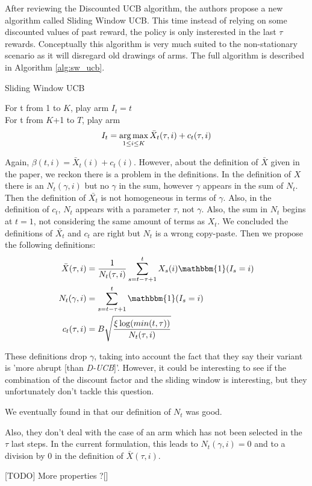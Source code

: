 After reviewing the Discounted UCB algorithm, the authors propose a new algorithm called Sliding Window UCB. This time instead of relying on some discounted values of past reward, the policy is only insterested in the last $\tau$ rewards. Conceptually this algorithm is very much suited to the non-stationary scenario as it will disregard old drawings of arms. The full algorithm is described in Algorithm \ref{alg:sw_ucb}.\\

\begin{algorithm}
    \caption{Sliding Window UCB}
    \label{alg:sw_ucb}
    For t from 1 to $K$, play arm $I_t = t$ \\
    For t from $K$+1 to $T$, play arm 
    $$ I_t = \operatorname*{arg\,max}_{1\leq i \leq K} \bar X_t(\tau,i) + c_t(\tau,i)$$
\end{algorithm}

Again, $\beta(t,i)=\bar{X}_t(i)+c_t(i)$.
However, about the definition of $\bar{X}$ given in the paper, we reckon there is a problem in the definitions. In the definition of $X$ there is an $N_t(\gamma, i)$ but no $\gamma$ in the sum, however $\gamma$ appears in the sum of $N_t$. Then the definition of $\bar{X_t}$ is not homogeneous in terms of $\gamma$. Also, in the definition of $c_t$, $N_t$ appears with a parameter $\tau$, not $\gamma$. Also, the sum in $N_t$ begins at $t=1$, not considering the same amount of terms as $X_t$. We concluded the definitions of $\bar{X_t}$ and $c_t$ are right but $N_t$ is a wrong copy-paste. Then we propose the following definitions:
\begin{align}
\bar{X}(\tau, i) &= \frac{1}{N_t(\tau, i)}\sum_{s=t-\tau+1}^t X_s(i)\mathbbm{1}(I_s=i) \\
N_t(\gamma, i) &= \sum_{s=t-\tau+1}^t \mathbbm{1}(I_s=i) \\
c_t(\tau, i) &= B\sqrt{\frac{\xi \log(min(t, \tau))}{N_t(\tau,i)}}
\end{align}

These definitions drop $\gamma$, taking into account the fact that they say their variant is 'more abrupt [than \textit{D-UCB}]'. However, it could be interesting to see if the combination of the discount factor and the sliding window is interesting, but they unfortunately don't tackle this question.

We eventually found in \cite{slidesGarivier} that our definition of $N_t$ was good.

Also, they don't deal with the case of an arm which has not been selected in the $\tau$ last steps. In the current formulation, this leads to $N_t(\gamma, i)=0$ and to a division by $0$ in the definition of $\bar{X}(\tau, i)$.

[TODO] More properties ?[]